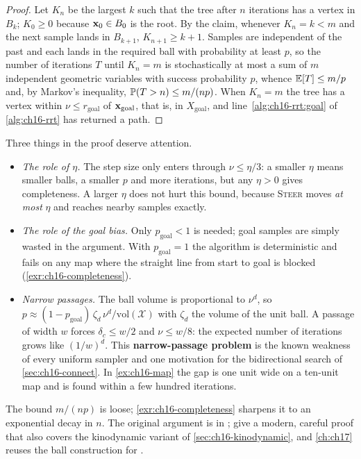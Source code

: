 \begin{proof}
Let $K_n$ be the largest $k$ such that the tree after $n$ iterations has a
vertex in $B_k$; $K_0\ge0$ because $\mathbf{x}_0\in B_0$ is the root. By the claim,
whenever $K_n=k<m$ and the next sample lands in $B_{k+1}$, $K_{n+1}\ge k+1$.
Samples are independent of the past and each lands in the required ball with
probability at least $p$, so the number of iterations $T$ until $K_n=m$ is
stochastically at most a sum of $m$ independent geometric variables with
success probability $p$, whence $\mathbb{E}[T]\le m/p$ and, by Markov's inequality,
$\mathbb{P}(T>n)\le m/(np)$. When $K_n=m$ the tree has a vertex within
$\nu\le r_{\mathrm{goal}}$ of $\mathbf{x}_{\mathrm{goal}}$, that is, in
$X_{\mathrm{goal}}$, and line~\ref{alg:ch16-rrt:goal} of \cref{alg:ch16-rrt}
has returned a path.
\qedhere
\end{proof}

Three things in the proof deserve attention.
\begin{itemize}
  \item \emph{The role of $\eta$.} The step size only enters through $\nu\le\eta/3$:
        a smaller $\eta$ means smaller balls, a smaller $p$ and more
        iterations, but any $\eta>0$ gives completeness. A larger $\eta$ does
        not hurt this bound, because \textsc{Steer} moves \emph{at most} $\eta$ and
        reaches nearby samples exactly.
  \item \emph{The role of the goal bias.} Only $p_{\mathrm{goal}}<1$ is needed;
        goal samples are simply wasted in the argument. With
        $p_{\mathrm{goal}}=1$ the algorithm is deterministic and fails on any
        map where the straight line from start to goal is blocked
        (\cref{exr:ch16-completeness}).
  \item \emph{Narrow passages.} The ball volume is proportional to $\nu^{d}$, so
        $p\approx(1-p_{\mathrm{goal}})\,\zeta_d\,\nu^{d}/\mathrm{vol}(\mathcal{X})$
        with $\zeta_d$ the volume of the unit ball. A passage of width $w$
        forces $\delta_{c}\le w/2$ and $\nu\le w/8$: the expected number of
        iterations grows like $(1/w)^{d}$. This \textbf{narrow-passage
        problem} is the known weakness of every
        uniform sampler and one motivation for the bidirectional search of
        \cref{sec:ch16-connect}. In \cref{ex:ch16-map} the gap is one unit
        wide on a ten-unit map and is found within a few hundred iterations.
\end{itemize}
The bound $m/(np)$ is loose; \cref{exr:ch16-completeness} sharpens it to an
exponential decay in $n$. The original argument is in
\textcite{lavalle2001randomized}; \textcite{kleinbort2019completeness} give a
modern, careful proof that also covers the kinodynamic variant of
\cref{sec:ch16-kinodynamic}, and \cref{ch:ch17} reuses the ball construction
for \rrtstar.

